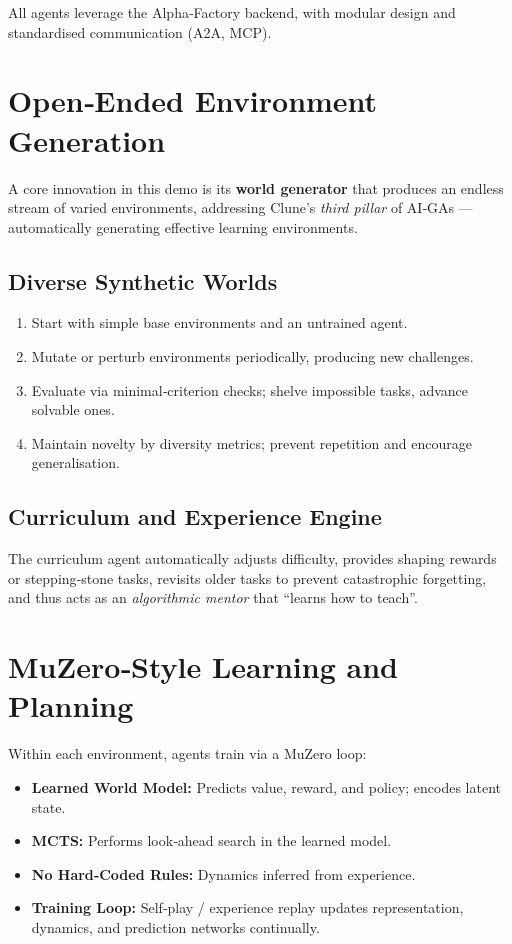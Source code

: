 \documentclass{article}
\begin{document}
All agents leverage the Alpha‑Factory backend, with modular design and standardised communication (A2A, MCP).

\section*{Open‑Ended Environment Generation}

A core innovation in this demo is its \textbf{world generator} that produces an endless stream of varied environments, addressing Clune's \textit{third pillar} of AI‑GAs --- automatically generating effective learning environments.

\subsection*{Diverse Synthetic Worlds}

\begin{enumerate}[leftmargin=*]
  \item Start with simple base environments and an untrained agent.
  \item Mutate or perturb environments periodically, producing new challenges.
  \item Evaluate via minimal‑criterion checks; shelve impossible tasks, advance solvable ones.
  \item Maintain novelty by diversity metrics; prevent repetition and encourage generalisation.
\end{enumerate}

\subsection*{Curriculum and Experience Engine}

The curriculum agent automatically adjusts difficulty, provides shaping rewards or stepping‑stone tasks, revisits older tasks to prevent catastrophic forgetting, and thus acts as an \textit{algorithmic mentor} that ``learns how to teach''.

\section*{MuZero‑Style Learning and Planning}

Within each environment, agents train via a MuZero loop:

\begin{itemize}[leftmargin=*]
  \item \textbf{Learned World Model:} Predicts value, reward, and policy; encodes latent state.
  \item \textbf{MCTS:} Performs look‑ahead search in the learned model.
  \item \textbf{No Hard‑Coded Rules:} Dynamics inferred from experience.
  \item \textbf{Training Loop:} Self‑play / experience replay updates representation, dynamics, and prediction networks continually.
\end{itemize}
\end{document}

